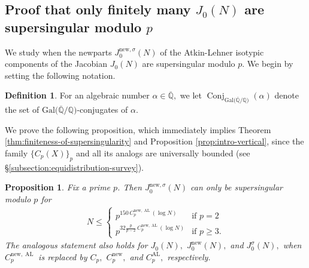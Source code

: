 \documentclass[11pt,letterpaper,reqno]{amsart}
\newtheorem{proposition}[theorem]{Proposition}
\theoremstyle{definition}
\newtheorem{definition}[theorem]{Definition}
\numberwithin{equation}{section}
\numberwithin{figure}{section}
\numberwithin{table}{section}
\let\subsectiontemp\subsection
\renewcommand{\subsection}[1]{ 
    \subsectiontemp{#1} \hfill\vspace{0.5\linespacing} 
}
\newcommand{\nw}{\mathrm{new}}
\begin{document}
\subsection{Proof that only finitely many \texorpdfstring{$J_0(N)$}{J0(N)} are supersingular modulo \texorpdfstring{$p$}{p}}\label{subsection:proof-of-main-vertical-theorem}

We study when the newparts $J_0^{\nw,\sigma}(N)$ of the Atkin-Lehner isotypic components of the Jacobian $J_0(N)$ are supersingular modulo $p$. We begin by setting the following notation.

\begin{definition}
    For an algebraic number $\alpha \in \overline{\mathbb{Q}},$ we let
$\operatorname{Conj}_{\operatorname{Gal(\overline{\mathbb{Q}}/\mathbb{Q}})} ( \alpha)$
denote the set of $\operatorname{Gal(\overline{\mathbb{Q}}/\mathbb{Q}})$-conjugates of $\alpha.$
\end{definition}

We prove the following proposition, which immediately implies Theorem \ref{thm:finiteness-of-supersingularity} and Proposition \ref{prop:intro-vertical}, since the family $\{ C_p(X) \}_p$ and all its analogs are universally bounded (see \S\ref{subsection:equidistribution-survey}).


\begin{proposition}\label{prop:vertical-supersingularity}
Fix a prime \(p\). Then $J_0^{\nw,\sigma}(N)$ can only be supersingular modulo $p$ for
\begin{align}
    N \leq \begin{cases}
        p^{150 \,C_p^{\nw,\operatorname{AL}}(\log N)} & \text{if } p = 2\\
        p^{32\frac{p}{p - 2} \, C_p^{\nw,\operatorname{AL}}(\log N)} & 
        \text{if } p \geq 3.
    \end{cases}
\end{align}
The analogous statement also holds for $J_0(N),$ $J_0^\nw(N),$ and $J_0^{\sigma}(N),$ when $C_p^{\nw, {\operatorname{AL}}}$ is replaced by $C_p,$ $C_p^\nw,$ and $C_p^{\operatorname{AL}},$ respectively.
\end{proposition}
\end{document}
